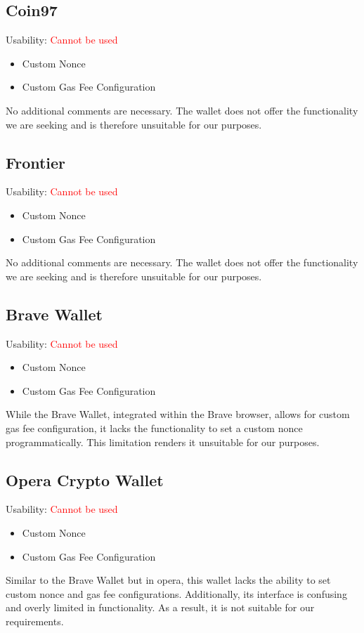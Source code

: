 \documentclass[fleqn,10pt]{olplainarticle}
\newcommand{\cmark}{\ding{51}}%
\newcommand{\xmark}{\ding{55}}%
\begin{document}
\subsection{Coin97}
Usability: \textcolor{red}{Cannot be used}
\begin{itemize}[noitemsep, nolistsep]
	\item [\textcolor{red}{\xmark}] Custom Nonce
	\item [\textcolor{green}{\cmark}] Custom Gas Fee Configuration
\end{itemize}
No additional comments are necessary. The wallet does not offer the functionality we are seeking and is therefore unsuitable for our purposes.

\subsection{Frontier}
Usability: \textcolor{red}{Cannot be used}
\begin{itemize}[noitemsep, nolistsep]
	\item [\textcolor{red}{\xmark}] Custom Nonce
	\item [\textcolor{red}{\xmark}]  Custom Gas Fee Configuration
\end{itemize}
No additional comments are necessary. The wallet does not offer the functionality we are seeking and is therefore unsuitable for our purposes.

\subsection{Brave Wallet}
Usability: \textcolor{red}{Cannot be used}
\begin{itemize}[noitemsep, nolistsep]
	\item [\textcolor{red}{\xmark}] Custom Nonce
	\item [\textcolor{green}{\cmark}] Custom Gas Fee Configuration
\end{itemize}
While the Brave Wallet, integrated within the Brave browser, allows for custom gas fee configuration, it lacks the functionality to set a custom nonce programmatically. This limitation renders it unsuitable for our purposes.

\subsection{Opera Crypto Wallet}
Usability: \textcolor{red}{Cannot be used}
\begin{itemize}[noitemsep, nolistsep]
	\item [\textcolor{red}{\xmark}] Custom Nonce
	\item [\textcolor{red}{\xmark}] Custom Gas Fee Configuration
\end{itemize}
Similar to the Brave Wallet but in opera, this wallet lacks the ability to set custom nonce and gas fee configurations. Additionally, its interface is confusing and overly limited in functionality. As a result, it is not suitable for our requirements.
\end{document}
